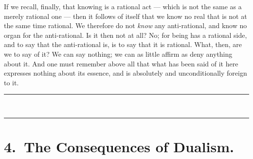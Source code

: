 \documentclass[12pt,a4paper]{book}
\newcommand{\opage}[1]{\marginnote{\footnotesize\textit{[#1]}}}
\begin{document}
If we recall, finally, that knowing is a rational act --- which is not the same
as a merely rational one --- then it follows of itself that we know no real
that is not at the same time rational. We therefore do not \emph{know} any
anti-rational, and know no organ for the anti-rational. Is it then not at all?
No; for being has a rational side, and to say that the anti-rational is, is to
say that it is rational.
\opage{54}What, then, are we to say of it? We can say nothing; we can as little
affirm as deny anything about it. And one must remember above all that what has
been said of it here expresses nothing about its essence, and is absolutely and
unconditionally foreign to it.

\begin{center}
\rule{2cm}{0.4pt}\\[-4pt]
\rule{2cm}{0.4pt}
\end{center}

\chapter*{4.\ The Consequences of Dualism.}
\label{ch:4}
\end{document}
